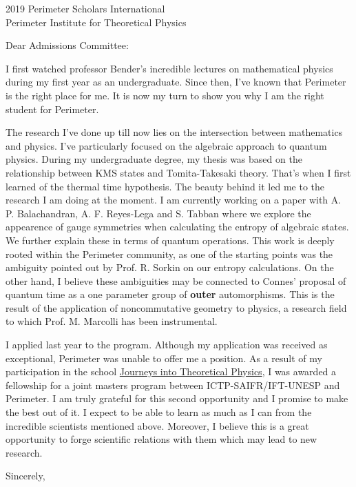 \documentclass{letter}
\begin{document}
\begin{letter}{2019 Perimeter Scholars International \\ Perimeter Institute for Theoretical Physics}

\opening{Dear Admissions Committee:}

I first watched professor Bender's incredible lectures on mathematical physics during my first year as an undergraduate. Since then, I've known that Perimeter is the right place for me. It is now my turn to show you why I am the right student for Perimeter.

The research I've done up till now lies on the intersection between mathematics and physics. I've particularly focused on the algebraic approach to quantum physics. During my undergraduate degree, my thesis was based on the relationship between KMS states and Tomita-Takesaki theory. That's when I first learned of the thermal time hypothesis. The beauty behind it led me to the research I am doing at the moment. I am currently working on a paper with A. P. Balachandran, A. F. Reyes-Lega and S. Tabban where we explore the appearence of gauge symmetries when calculating the entropy of algebraic states. We further explain these in terms of quantum operations. This work is deeply rooted within the Perimeter community, as one of the starting points was the ambiguity pointed out by Prof. R. Sorkin on our entropy calculations. On the other hand, I believe these ambiguities may be connected to Connes' proposal of quantum time as a one parameter group of {\bf outer} automorphisms. This is the result of the application of noncommutative geometry to physics, a research field to which Prof. M. Marcolli has been instrumental.

I applied last year to the program. Although my application was received as exceptional, Perimeter was unable to offer me a position. As a result of my participation in the school \href{http://journeys.ictp-saifr.org/}{Journeys into Theoretical Physics}, I was awarded a fellowship for a joint masters program between ICTP-SAIFR/IFT-UNESP and Perimeter. I am truly grateful for this second opportunity and I promise to make the best out of it. I expect to be able to learn as much as I can from the incredible scientists mentioned above. Moreover, I believe this is a great opportunity to forge scientific relations with them which may lead to new research.

\closing{Sincerely,}

\end{letter}
\end{document}
